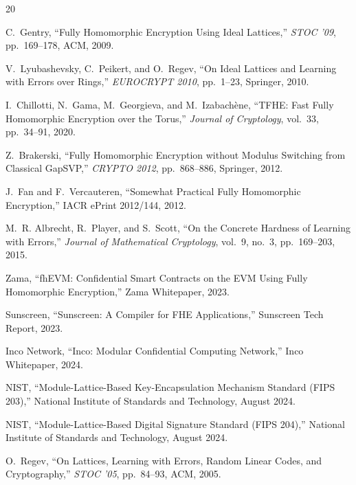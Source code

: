 \documentclass[11pt,a4paper]{article}
\begin{document}
\begin{thebibliography}{20}

C.~Gentry, ``Fully Homomorphic Encryption Using Ideal Lattices,'' \emph{STOC '09},
pp.~169--178, ACM, 2009.

V.~Lyubashevsky, C.~Peikert, and O.~Regev, ``On Ideal Lattices and Learning with
Errors over Rings,'' \emph{EUROCRYPT 2010}, pp.~1--23, Springer, 2010.

I.~Chillotti, N.~Gama, M.~Georgieva, and M.~Izabach\`ene, ``TFHE: Fast Fully
Homomorphic Encryption over the Torus,'' \emph{Journal of Cryptology}, vol.~33,
pp.~34--91, 2020.

Z.~Brakerski, ``Fully Homomorphic Encryption without Modulus Switching from Classical
GapSVP,'' \emph{CRYPTO 2012}, pp.~868--886, Springer, 2012.

J.~Fan and F.~Vercauteren, ``Somewhat Practical Fully Homomorphic Encryption,''
IACR ePrint 2012/144, 2012.

M.~R. Albrecht, R.~Player, and S.~Scott, ``On the Concrete Hardness of Learning with
Errors,'' \emph{Journal of Mathematical Cryptology}, vol.~9, no.~3, pp.~169--203, 2015.

Zama, ``fhEVM: Confidential Smart Contracts on the EVM Using Fully Homomorphic
Encryption,'' Zama Whitepaper, 2023.

Sunscreen, ``Sunscreen: A Compiler for FHE Applications,'' Sunscreen Tech Report, 2023.

Inco Network, ``Inco: Modular Confidential Computing Network,'' Inco Whitepaper, 2024.

NIST, ``Module-Lattice-Based Key-Encapsulation Mechanism Standard (FIPS 203),''
National Institute of Standards and Technology, August 2024.

NIST, ``Module-Lattice-Based Digital Signature Standard (FIPS 204),''
National Institute of Standards and Technology, August 2024.

O.~Regev, ``On Lattices, Learning with Errors, Random Linear Codes, and Cryptography,''
\emph{STOC '05}, pp.~84--93, ACM, 2005.

\end{thebibliography}
\end{document}
